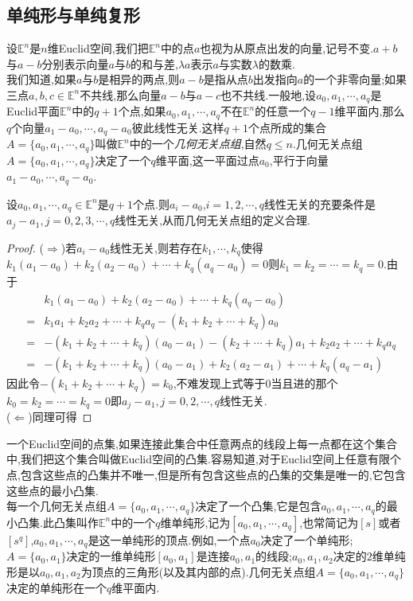 \documentclass{article}
\begin{document}
\subsection{单纯形与单纯复形\cite{周建伟2007代数拓扑讲义}}
设$\mathbb{E}^n$是$n$维Euclid空间,我们把$\mathbb{E}^n$中的点$a$也视为从原点出发的向量,记号不变.$a+b$与$a-b$分别表示向量$a$与$b$的和与差,$\lambda a$表示$a$与实数$\lambda$的数乘.\\
我们知道,如果$a$与$b$是相异的两点,则$a-b$是指从点$b$出发指向$a$的一个非零向量;如果三点$a,b,c\in\mathbb{E}^n$不共线,那么向量$a-b$与$a-c$也不共线.一般地,设$a_0,a_1,\cdots,a_q$是Euclid平面$\mathbb{E}^n$中的$q+1$个点,如果$a_0,a_1,\cdots,a_q$不在$\mathbb{E}^n$的任意一个$q-1$维平面内,那么$q$个向量$a_1-a_0,\cdots,a_q-a_0$彼此线性无关.这样$q+1$个点所成的集合$A = \{a_0,a_1,\cdots,a_q\}$叫做$\mathbb{E}^n$中的一个\emph{几何无关点组},自然$q\leq n$.几何无关点组$A = \{a_0,a_1,\cdots,a_q\}$决定了一个$q$维平面,这一平面过点$a_0$,平行于向量$a_1 - a_0,\cdots,a_q - a_0$.\\
\begin{lemma}
    设$a_0,a_1,\cdots,a_q\in \mathbb{E}^n$是$q+1$个点.则$a_i - a_0$,$i= 1,2,\cdots,q$线性无关的充要条件是$a_j - a_1, j = 0,2,3,\cdots,q$线性无关,从而几何无关点组的定义合理.
\end{lemma}
\begin{proof}
    ($\Rightarrow$)若$a_i - a_0$线性无关,则若存在$k_1,\cdots,k_q$使得$k_1(a_1-a_0)+k_2(a_2-a_0)+\cdots +k_q(a_q-a_0)=0$则$k_1 = k_2 = \cdots = k_q = 0$.由于
    \begin{eqnarray*}
    &&k_1(a_1-a_0) +k_2(a_2-a_0)+\cdots+k_q(a_q-a_0) \\
    &=& k_1a_1+k_2a_2+\cdots+k_qa_q - (k_1+k_2+\cdots + k_q)a_0\\
    &=& -(k_1+k_2+\cdots+k_q)(a_0-a_1) -(k_2+\cdots+k_q)a_1+k_2a_2+\cdots + k_q a_q\\
    &=& -(k_1+k_2+\cdots+k_q)(a_0-a_1) + k_2(a_2-a_1)+\cdots + k_q(a_q - a_1)
    \end{eqnarray*}
    因此令$-(k_1+k_2+\cdots+k_q) = k_0$,不难发现上式等于$0$当且进的那个$k_0 = k_2 = \cdots = k_q = 0$即$a_j - a_1 , j = 0,2,\cdots , q$线性无关.\\
    ($\Leftarrow$)同理可得
\end{proof}
一个Euclid空间的点集,如果连接此集合中任意两点的线段上每一点都在这个集合中,我们把这个集合叫做Euclid空间的凸集.容易知道,对于Euclid空间上任意有限个点,包含这些点的凸集并不唯一,但是所有包含这些点的凸集的交集是唯一的,它包含这些点的最小凸集.\\
每一个几何无关点组$A = \{a_0,a_1,\cdots,a_q\}$决定了一个凸集,它是包含$a_0,a_1,\cdots,a_q$的最小凸集.此凸集叫作$\mathbb{E}^n$中的一个$q$维单纯形,记为$[a_0,a_1,\cdots,a_q]$,也常简记为$[s]$或者$[s^q]$,$a_0,a_1,\cdots,a_q$是这一单纯形的顶点.例如,一个点$a_0$决定了一个单纯形;$A = \{a_0,a_1\}$决定的一维单纯形$[a_0,a_1]$是连接$a_0,a_1$的线段;$a_0,a_1,a_2$决定的$2$维单纯形是以$a_0,a_1,a_2$为顶点的三角形(以及其内部的点).几何无关点组$A = \{a_0,a_1,\cdots,a_q\}$决定的单纯形在一个$q$维平面内.
\end{document}
